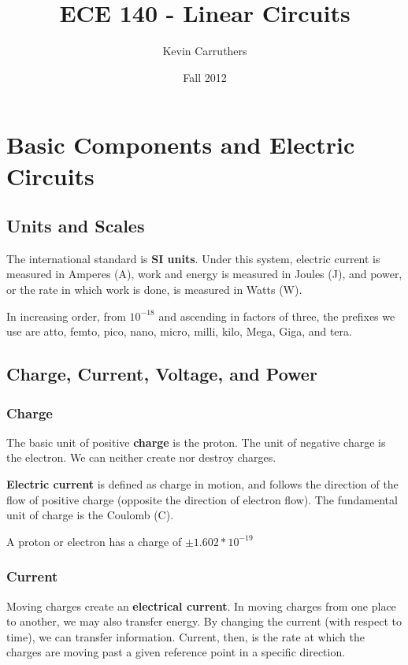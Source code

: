 \documentclass[12pt]{article}
\begin{document}
\title{ECE 140 - Linear Circuits}
\author{Kevin Carruthers}
\date{\vspace{-2ex}Fall 2012}
\maketitle\HRule

\section*{Basic Components and Electric Circuits}
\subsection*{Units and Scales}
The international standard is {\bf SI units}. Under this system, electric current is measured in Amperes (A), work and energy is measured in Joules (J), and power, or the rate in which work is done, is measured in Watts (W).

In increasing order, from $10^{-18}$ and ascending in factors of three, the prefixes we use are atto, femto, pico, nano, micro, milli, kilo, Mega, Giga, and tera.

\subsection*{Charge, Current, Voltage, and Power}
\subsubsection*{Charge}
The basic unit of positive {\bf charge} is the proton. The unit of negative charge is the electron. We can neither create nor destroy charges.

{\bf Electric current} is defined as charge in motion, and follows the direction of the flow of positive charge (opposite the direction of electron flow). The fundamental unit of charge is the Coulomb (C).

A proton or electron has a charge of $\pm 1.602 * 10^{-19}$

\subsubsection*{Current}
Moving charges create an {\bf electrical current}. In moving charges from one place to another, we may also transfer energy. By changing the current (with respect to time), we can transfer information. Current, then, is the rate at which the charges are moving past a given reference point in a specific direction.
\end{document}
